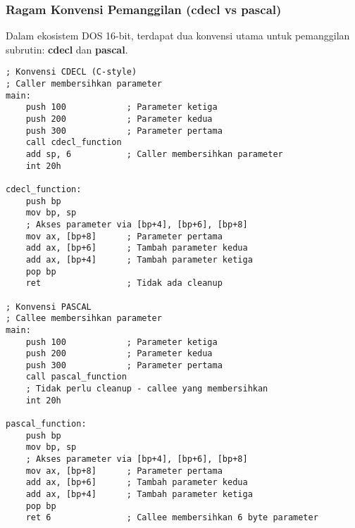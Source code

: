 \documentclass[../main.tex]{subfiles}
\begin{document}
            \subsubsection{Ragam Konvensi Pemanggilan (cdecl vs pascal)}
                Dalam ekosistem DOS 16-bit, terdapat dua konvensi utama untuk pemanggilan subrutin: \textbf{cdecl} dan \textbf{pascal}.

                \begin{lstlisting}[language={[x86masm]Assembler}, caption=Konvensi Cdecl vs Pascal, label={lst:cdecl-pascal}]
; Konvensi CDECL (C-style)
; Caller membersihkan parameter
main:
    push 100            ; Parameter ketiga
    push 200            ; Parameter kedua
    push 300            ; Parameter pertama
    call cdecl_function
    add sp, 6           ; Caller membersihkan parameter
    int 20h

cdecl_function:
    push bp
    mov bp, sp
    ; Akses parameter via [bp+4], [bp+6], [bp+8]
    mov ax, [bp+8]      ; Parameter pertama
    add ax, [bp+6]      ; Tambah parameter kedua
    add ax, [bp+4]      ; Tambah parameter ketiga
    pop bp
    ret                 ; Tidak ada cleanup

; Konvensi PASCAL
; Callee membersihkan parameter
main:
    push 100            ; Parameter ketiga
    push 200            ; Parameter kedua
    push 300            ; Parameter pertama
    call pascal_function
    ; Tidak perlu cleanup - callee yang membersihkan
    int 20h

pascal_function:
    push bp
    mov bp, sp
    ; Akses parameter via [bp+4], [bp+6], [bp+8]
    mov ax, [bp+8]      ; Parameter pertama
    add ax, [bp+6]      ; Tambah parameter kedua
    add ax, [bp+4]      ; Tambah parameter ketiga
    pop bp
    ret 6               ; Callee membersihkan 6 byte parameter
                \end{lstlisting}
\end{document}
